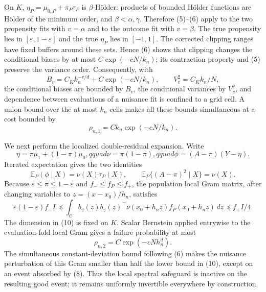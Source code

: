 On \(K\), \(\eta_P=\mu_{0,P}+\pi_P\tau_P\) is
\(\beta\)-H\"older: products of bounded H\"older functions are
H\"older of the minimum order, and \(\beta<\alpha,\gamma\).  Therefore
(5)--(6) apply to the two propensity fits with \(v=\alpha\) and to the
outcome fit with \(v=\beta\).  The true propensity lies in
\([\varepsilon,1-\varepsilon]\) and the true \(\eta_P\) lies in
\([-1,1]\).  The corrected clipping ranges have fixed buffers around these
sets.  Hence (6) shows that clipping changes the conditional biases by at most
\(C\exp(-cN/k_n)\); its contraction property and (5) preserve the variance
order.  Consequently, with
\[
B_v=C_Kk_n^{-v/d}+C\exp(-cN/k_n),
\qquad V_v^2=C_Kk_n/N, \tag{7}
\]
the conditional biases are bounded by \(B_v\), the conditional variances by
\(V_v^2\), and dependence between evaluations of a nuisance fit is confined
to a grid cell.  A union bound over the at most \(k_n\) cells makes all these
bounds simultaneous at a cost bounded by
\[
\rho_{n,1}=Ck_n\exp(-cN/k_n). \tag{8}
\]

We next perform the localized double-residual expansion.  Write
\[
\eta=\pi\mu_1+(1-\pi)\mu_0,qquad
\nu=\pi(1-\pi),qquad
\phi=(A-\pi)(Y-\eta).
\]
Iterated expectation gives the two identities
\[
\mathbb E_P(\phi\mid X)=\nu(X)\tau_P(X),
\qquad
\mathbb E_P\{(A-\pi)^2\mid X\}=\nu(X). \tag{9}
\]
Because \(\varepsilon\leq\pi\leq1-\varepsilon\) and
\(f_-\leq f_P\leq f_+\), the population local Gram matrix, after changing
variables to \(z=(x-x_0)/h_n\), satisfies
\[
\varepsilon(1-\varepsilon)f_-I
\preceq
\int_{\mathcal C}b_\gamma(z)b_\gamma(z)^\top
\nu(x_0+h_nz)f_P(x_0+h_nz)\,dz
\preceq f_+I/4. \tag{10}
\]
The dimension in (10) is fixed on \(K\).  Scalar Bernstein applied entrywise
to the evaluation-fold local Gram gives a failure probability at most
\[
\rho_{n,2}=C\exp(-cNh_n^d). \tag{11}
\]
The simultaneous constant-deviation bound following (6) makes the nuisance
perturbation of this Gram smaller than half the lower bound in (10), except on
an event absorbed by (8).  Thus the local spectral safeguard is inactive on
the resulting good event; it remains uniformly invertible everywhere by
construction.

